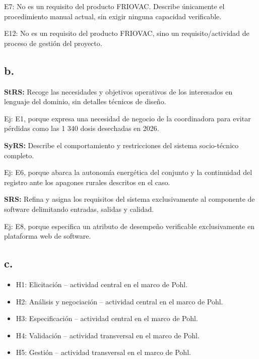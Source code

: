 \documentclass[11pt,a4paper]{article}
\begin{document}
E7: No es un requisito del producto FRIOVAC.
Describe únicamente el procedimiento manual
actual, sin exigir ninguna capacidad verificable.

E12: No es un requisito del producto FRIOVAC,
sino un requisito/actividad de proceso de
gestión del proyecto.

\subsection*{b.}

\textbf{StRS:} Recoge las necesidades y objetivos
operativos de los interesados en lenguaje del
dominio, sin detalles técnicos de diseño.

Ej: E1, porque expresa una necesidad de negocio
de la coordinadora para evitar pérdidas como las
1 340 dosis desechadas en 2026.

\textbf{SyRS:} Describe el comportamiento y
restricciones del sistema socio-técnico completo.

Ej: E6, porque abarca la autonomía energética
del conjunto y la continuidad del registro ante
los apagones rurales descritos en el caso.

\textbf{SRS:} Refina y asigna los requisitos del
sistema exclusivamente al componente de software
delimitando entradas, salidas y calidad.

Ej: E8, porque especifica un atributo de
desempeño verificable exclusivamente en
plataforma web de software.

\subsection*{c.}

\begin{itemize}
    \item H1: Elicitación -- actividad central
    en el marco de Pohl.

    \item H2: Análisis y negociación --
    actividad central en el marco de Pohl.

    \item H3: Especificación -- actividad
    central en el marco de Pohl.

    \item H4: Validación -- actividad
    transversal en el marco de Pohl.

    \item H5: Gestión -- actividad
    transversal en el marco de Pohl.
\end{itemize}
\end{document}
